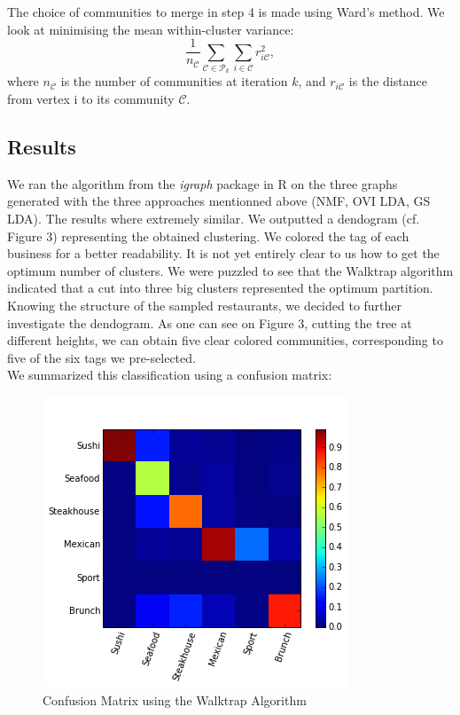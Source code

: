 \documentclass[twoside]{article}
\begin{document}
\begin{multicols}{2}
\noindent The choice of communities to merge in step 4 is made using Ward's method. We look at minimising the mean within-cluster variance:
$$\frac{1}{n_\mathcal{C}}\sum\limits_{\mathcal{C}\in\mathcal{P}_{k}}\sum\limits_{i\in\mathcal{C}}r^2_{i\mathcal{C}},$$
\noindent where $n_\mathcal{C}$ is the number of communities at iteration $k$, and $r_{i\mathcal{C}}$ is the distance from vertex i to its community $\mathcal{C}$.\\

\subsection{Results}

We ran the algorithm from the \emph{igraph} package in R on the three graphs generated with the three approaches mentionned above (NMF, OVI LDA, GS LDA). The results where extremely similar. We outputted a dendogram (cf. Figure 3) representing the obtained clustering. We colored the tag of each business for a better readability.  It is not yet entirely clear to us how to get the optimum number of clusters. We were puzzled to see that the Walktrap algorithm indicated that a cut into three big clusters represented the optimum partition. Knowing the structure of the sampled restaurants, we decided to further investigate the dendogram. As one can see on Figure 3, cutting the tree at different heights, we can obtain five clear colored communities, corresponding to five of the six tags we pre-selected.\\

\noindent We summarized this classification using a confusion matrix: 
\begin{figure}[H]
\centering
\includegraphics[width=1\linewidth]{img/confusion}
\caption{Confusion Matrix using the Walktrap Algorithm}
\end{figure}


\end{multicols}
\end{document}
